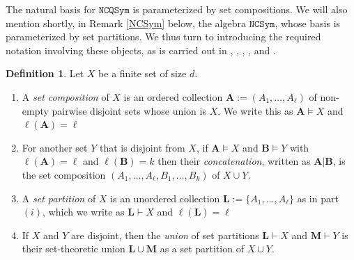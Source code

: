 \documentclass{article}
\theoremstyle{definition}
\newtheorem{defn}[thm]{Definition}
\begin{document}
The natural basis for $\mathtt{NCQSym}$ is parameterized by set compositions. We will also mention shortly, in Remark \ref{NCSym} below, the algebra $\mathtt{NCSym}$, whose basis is parameterized by set partitions. We thus turn to introducing the required notation involving these objects, as is carried out in \cite{[BZ]}, \cite{[BHRZ]}, \cite{[BRRZ]}, \cite{[LM]}, and \cite{[D]}.
\begin{defn}
Let $X$ be a finite set of size $d$.
\begin{enumerate}[$(i)$]
\item A \emph{set composition} of $X$ is an ordered collection $\mathbf{A}:=(A_{1},\ldots,A_{\ell})$ of non-empty pairwise disjoint sets whose union is $X$. We write this as $\mathbf{A} \vDash X$ and $\ell(\mathbf{A})=\ell$
\item For another set $Y$ that is disjoint from $X$, if $\mathbf{A} \vDash X$ and $\mathbf{B} \vDash Y$ with $\ell(\mathbf{A})=\ell$ and $\ell(\mathbf{B})=k$ then their \emph{concatenation}, written as $\mathbf{A}|\mathbf{B}$, is the set composition $(A_{1},\ldots,A_{\ell},B_{1},\ldots,B_{k})$ of $X \cup Y$.
\item A \emph{set partition} of $X$ is an unordered collection $\mathbf{L}:=\{A_{1},\ldots,A_{\ell}\}$ as in part $(i)$, which we write as $\mathbf{L} \vdash X$ and $\ell(\mathbf{L})=\ell$
\item If $X$ and $Y$ are disjoint, then the \emph{union} of set partitions $\mathbf{L} \vdash X$ and $\mathbf{M} \vdash Y$ is their set-theoretic union $\mathbf{L}\cup\mathbf{M}$ as a set partition of $X \cup Y$.
\end{enumerate} \label{setcomppar}
\end{defn}
\end{document}
